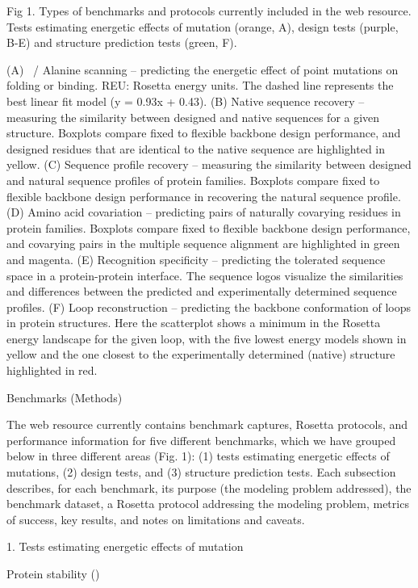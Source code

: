 Fig 1. Types of benchmarks and protocols currently included in the web resource. Tests estimating energetic effects of mutation (orange, A), design tests (purple, B-E) and structure prediction tests (green, F).

(A) \ddg\ / Alanine scanning – predicting the energetic effect of point mutations on folding or binding. REU: Rosetta energy units. The dashed line represents the best linear fit model (y = 0.93x + 0.43). (B) Native sequence recovery – measuring the similarity between designed and native sequences for a given structure. Boxplots compare fixed to flexible backbone design performance, and designed residues that are identical to the native sequence are highlighted in yellow. (C) Sequence profile recovery – measuring the similarity between designed and natural sequence profiles of protein families. Boxplots compare fixed to flexible backbone design performance in recovering the natural sequence profile. (D) Amino acid covariation – predicting pairs of naturally covarying residues in protein families. Boxplots compare fixed to flexible backbone design performance, and covarying pairs in the multiple sequence alignment are highlighted in green and magenta. (E) Recognition specificity – predicting the tolerated sequence space in a protein-protein interface. The sequence logos \cite{crooks_weblogo:_2004} visualize the similarities and differences between the predicted and experimentally determined sequence profiles. (F) Loop reconstruction – predicting the backbone conformation of loops in protein structures. Here the scatterplot shows a minimum in the Rosetta energy landscape for the given loop, with the five lowest energy models shown in yellow and the one closest to the experimentally determined (native) structure highlighted in red.


Benchmarks (Methods)

The web resource currently contains benchmark captures, Rosetta protocols, and performance information for five different benchmarks, which we have grouped below in three different areas (Fig. 1): (1) tests estimating energetic effects of mutations, (2) design tests, and (3) structure prediction tests. Each subsection describes, for each benchmark, its purpose (the modeling problem addressed), the benchmark dataset, a Rosetta protocol addressing the modeling problem, metrics of success, key results, and notes on limitations and caveats.

1. Tests estimating energetic effects of mutation

Protein stability (\ddg)

